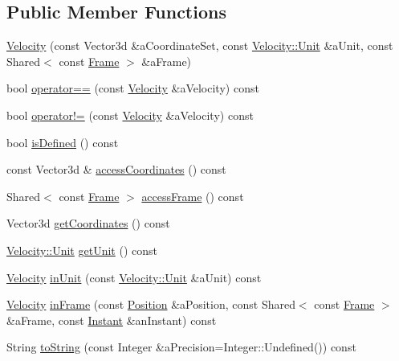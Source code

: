 \subsection*{Public Member Functions}
\begin{DoxyCompactItemize}
\item 
\hyperlink{classlibrary_1_1physics_1_1coord_1_1_velocity_a4e2058adb91710a45a6d8165fae9e8e0}{Velocity} (const Vector3d \&a\+Coordinate\+Set, const \hyperlink{classlibrary_1_1physics_1_1coord_1_1_velocity_a8bbc811932c454dbe0ab8b56f1b2c0b3}{Velocity\+::\+Unit} \&a\+Unit, const Shared$<$ const \hyperlink{classlibrary_1_1physics_1_1coord_1_1_frame}{Frame} $>$ \&a\+Frame)
\item 
bool \hyperlink{classlibrary_1_1physics_1_1coord_1_1_velocity_afa328f637276f940812aea194836aeb9}{operator==} (const \hyperlink{classlibrary_1_1physics_1_1coord_1_1_velocity}{Velocity} \&a\+Velocity) const
\item 
bool \hyperlink{classlibrary_1_1physics_1_1coord_1_1_velocity_aaa76cc11a5ecbbff21839f1ea5f8aa8e}{operator!=} (const \hyperlink{classlibrary_1_1physics_1_1coord_1_1_velocity}{Velocity} \&a\+Velocity) const
\item 
bool \hyperlink{classlibrary_1_1physics_1_1coord_1_1_velocity_a5487f6d50e13d2262bf0726ed8536c99}{is\+Defined} () const
\item 
const Vector3d \& \hyperlink{classlibrary_1_1physics_1_1coord_1_1_velocity_aea8fe9c62293e20393d9a662f277b0e7}{access\+Coordinates} () const
\item 
Shared$<$ const \hyperlink{classlibrary_1_1physics_1_1coord_1_1_frame}{Frame} $>$ \hyperlink{classlibrary_1_1physics_1_1coord_1_1_velocity_a1d3dc032dba7937276b06649cb16a871}{access\+Frame} () const
\item 
Vector3d \hyperlink{classlibrary_1_1physics_1_1coord_1_1_velocity_a1ac18f97a304ac026c2544292b89e030}{get\+Coordinates} () const
\item 
\hyperlink{classlibrary_1_1physics_1_1coord_1_1_velocity_a8bbc811932c454dbe0ab8b56f1b2c0b3}{Velocity\+::\+Unit} \hyperlink{classlibrary_1_1physics_1_1coord_1_1_velocity_aa04a5b82a46d5ea4e92bf53046a18494}{get\+Unit} () const
\item 
\hyperlink{classlibrary_1_1physics_1_1coord_1_1_velocity}{Velocity} \hyperlink{classlibrary_1_1physics_1_1coord_1_1_velocity_a814e6740d6b54cf5421d9aa7fc0f5958}{in\+Unit} (const \hyperlink{classlibrary_1_1physics_1_1coord_1_1_velocity_a8bbc811932c454dbe0ab8b56f1b2c0b3}{Velocity\+::\+Unit} \&a\+Unit) const
\item 
\hyperlink{classlibrary_1_1physics_1_1coord_1_1_velocity}{Velocity} \hyperlink{classlibrary_1_1physics_1_1coord_1_1_velocity_ac2e825fe682f526884764218425a14b7}{in\+Frame} (const \hyperlink{classlibrary_1_1physics_1_1coord_1_1_position}{Position} \&a\+Position, const Shared$<$ const \hyperlink{classlibrary_1_1physics_1_1coord_1_1_frame}{Frame} $>$ \&a\+Frame, const \hyperlink{classlibrary_1_1physics_1_1time_1_1_instant}{Instant} \&an\+Instant) const
\item 
String \hyperlink{classlibrary_1_1physics_1_1coord_1_1_velocity_a16c176cadc68b384eb3d8e5594b316bd}{to\+String} (const Integer \&a\+Precision=Integer\+::\+Undefined()) const
\end{DoxyCompactItemize}

